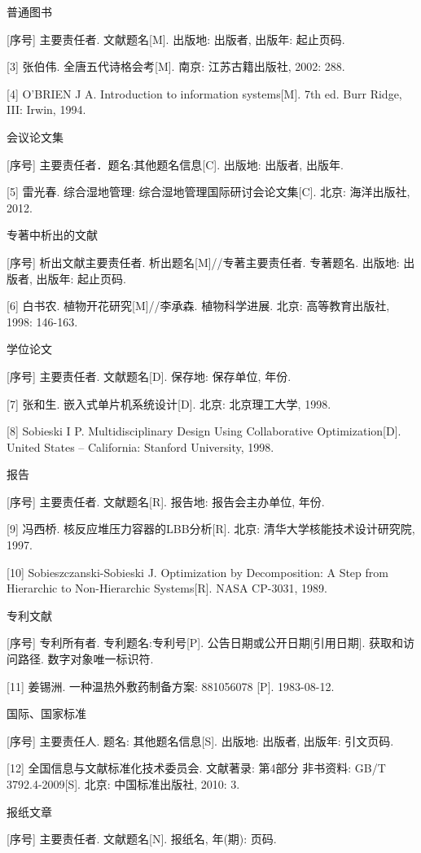 \documentclass[UTF8,12pt,a4paper,fontset=fandol]{ctexbook}
\begin{document}
普通图书

[序号] 主要责任者. 文献题名[M]. 出版地: 出版者, 出版年: 起止页码.

[3] 张伯伟. 全唐五代诗格会考[M]. 南京: 江苏古籍出版社, 2002: 288.

[4] O’BRIEN J A. Introduction to information systems[M]. 7th ed. Burr Ridge, III: Irwin, 1994.

会议论文集

[序号] 主要责任者．题名:其他题名信息[C]. 出版地: 出版者, 出版年.

[5] 雷光春. 综合湿地管理: 综合湿地管理国际研讨会论文集[C]. 北京: 海洋出版社, 2012.

专著中析出的文献

[序号] 析出文献主要责任者. 析出题名[M]//专著主要责任者. 专著题名. 出版地: 出版者, 出版年: 起止页码.

[6] 白书农. 植物开花研究[M]//李承森. 植物科学进展. 北京: 高等教育出版社, 1998: 146-163.

学位论文

[序号] 主要责任者. 文献题名[D]. 保存地: 保存单位, 年份.

[7] 张和生. 嵌入式单片机系统设计[D]. 北京: 北京理工大学, 1998.

[8] Sobieski I P. Multidisciplinary Design Using Collaborative Optimization[D]. United States -- California: Stanford University, 1998.

报告

[序号] 主要责任者. 文献题名[R]. 报告地: 报告会主办单位, 年份.

[9] 冯西桥. 核反应堆压力容器的LBB分析[R]. 北京: 清华大学核能技术设计研究院, 1997.

[10] Sobieszczanski-Sobieski J. Optimization by Decomposition: A Step from Hierarchic to Non-Hierarchic Systems[R]. NASA CP-3031, 1989.

专利文献

[序号] 专利所有者. 专利题名:专利号[P]. 公告日期或公开日期[引用日期]. 获取和访问路径. 数字对象唯一标识符.

[11] 姜锡洲. 一种温热外敷药制备方案: 881056078 [P]. 1983-08-12.

国际、国家标准

[序号] 主要责任人. 题名: 其他题名信息[S]. 出版地: 出版者, 出版年: 引文页码.

[12] 全国信息与文献标准化技术委员会. 文献著录: 第4部分 非书资料: GB/T 3792.4-2009[S].  北京: 中国标准出版社, 2010: 3.

报纸文章

[序号] 主要责任者. 文献题名[N]. 报纸名, 年(期): 页码.
\end{document}
